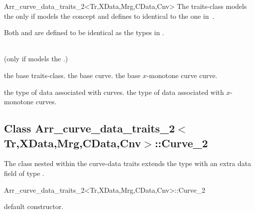 \begin{ccRefClass}{Arr_curve_data_traits_2<Tr,XData,Mrg,CData,Cnv>}
The traits-class models the  only
if  models the concept and
defines  to identical
to the one in~.

Both  and  are defined
to be identical as the types in .


 
\ccIsModel
     \\
     (only if  models the
    .) \\

\ccTypes

    {the base traits-class.}
\ccGlue
{}
    {the base curve.}
\ccGlue
{}
    {the base $x$-monotone curve curve.}

\ccGlue
{}

    {the type of data associated with curves.}
\ccGlue
{}
    {the type of data associated with $x$-monotone curves.}

\ccInheritsFrom

\subsection*{Class Arr\_curve\_data\_traits\_2$<$Tr,XData,Mrg,CData,Cnv$>$::Curve\_2}

The  class nested within the curve-data traits
extends the  type with an extra data field of type
.

\begin{ccClass}{Arr_curve_data_traits_2<Tr,XData,Mrg,CData,Cnv>::Curve_2}

\ccInheritsFrom

\ccCreation
{}

    {default constructor.}


\end{ccClass}
\end{ccRefClass}

